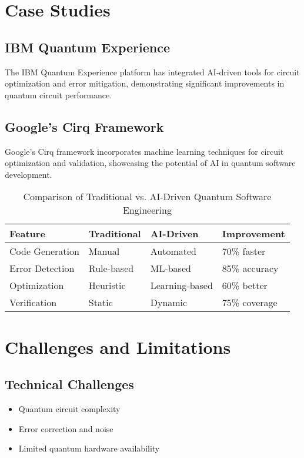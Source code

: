 \documentclass[10pt,twocolumn]{article}
\begin{document}
\section{Case Studies}
\subsection{IBM Quantum Experience}
The IBM Quantum Experience platform has integrated AI-driven tools for circuit optimization and error mitigation, demonstrating significant improvements in quantum circuit performance.

\subsection{Google's Cirq Framework}
Google's Cirq framework incorporates machine learning techniques for circuit optimization and validation, showcasing the potential of AI in quantum software development.

\begin{table*}[t]
\centering
\begin{tabular}{@{}llll@{}}
\toprule
\textbf{Feature} & \textbf{Traditional} & \textbf{AI-Driven} & \textbf{Improvement} \\
\midrule
Code Generation & Manual & Automated & 70\% faster \\
Error Detection & Rule-based & ML-based & 85\% accuracy \\
Optimization & Heuristic & Learning-based & 60\% better \\
Verification & Static & Dynamic & 75\% coverage \\
\bottomrule
\end{tabular}
\caption{Comparison of Traditional vs. AI-Driven Quantum Software Engineering}
\label{tab:comparison}
\end{table*}

\section{Challenges and Limitations}
\subsection{Technical Challenges}
\begin{itemize}[leftmargin=*]
    \item Quantum circuit complexity
    \item Error correction and noise
    \item Limited quantum hardware availability
\end{itemize}
\end{document}

